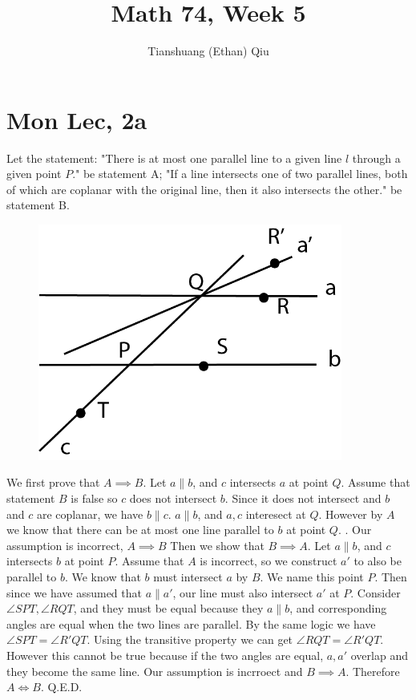 \documentclass[12pt]{article}
\author{Tianshuang (Ethan) Qiu}
\begin{document}
\title{Math 74, Week 5}
\maketitle


\section{Mon Lec, 2a}
Let the statement: "There is at most one parallel line to a given line $l$ through a given point $P$." be statement A;
\newline
"If a line intersects one of two parallel lines, both of which are coplanar with the original line, then it also intersects the other." be statement B.
\newline
\begin{figure}[h]
    \includegraphics[width = 100mm]{GRAPH1.png}
\end{figure}
\newline
We first prove that $A \implies B$. Let $a \parallel b$, and $c$ intersects $a$ at point $Q$. Assume that statement $B$ is false so $c$ does not intersect $b$. Since it does not intersect and $b$ and $c$ are coplanar, we have $b \parallel c$. $a \parallel b$, and $a, c$ interesect at $Q$. However by $A$ we know that there can be at most one line parallel to $b$ at point $Q$. \lightning. Our assumption is incorrect, $A \implies B$
\newline
Then we show that $B \implies A$. Let $a \parallel b$, and $c$ intersects $b$ at point $P$. Assume that $A$ is incorrect, so we construct $a'$ to also be parallel to $b$. We know that $b$ must intersect $a$ by $B$. We name this point $P$. Then since we have assumed that $a \parallel a'$, our line must also intersect $a'$ at $P$. Consider $\angle SPT, \angle RQT$, and they must be equal because they $a \parallel b$, and corresponding angles are equal when the two lines are parallel. By the same logic we have $\angle SPT = \angle R'QT$.
\newline
Using the transitive property we can get $\angle RQT = \angle R'QT$. However this cannot be true because if the two angles are equal, $a, a'$ overlap and they become the same line. \lightning
\newline
Our assumption is incrroect and $B \implies A$. Therefore $A \iff B$. Q.E.D.
\end{document}
